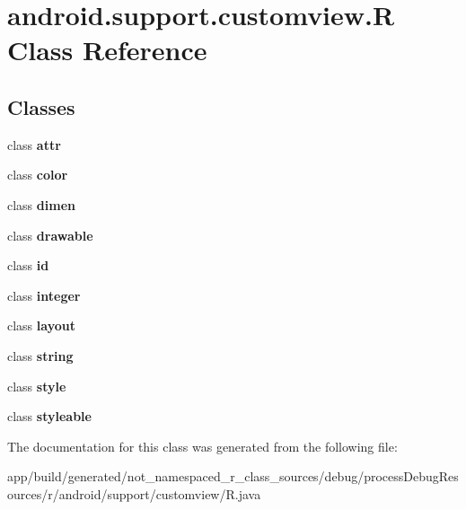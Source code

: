 \hypertarget{classandroid_1_1support_1_1customview_1_1_r}{}\section{android.\+support.\+customview.\+R Class Reference}
\label{classandroid_1_1support_1_1customview_1_1_r}
\subsection*{Classes}
\begin{DoxyCompactItemize}
\item 
class {\bfseries attr}
\item 
class {\bfseries color}
\item 
class {\bfseries dimen}
\item 
class {\bfseries drawable}
\item 
class {\bfseries id}
\item 
class {\bfseries integer}
\item 
class {\bfseries layout}
\item 
class {\bfseries string}
\item 
class {\bfseries style}
\item 
class {\bfseries styleable}
\end{DoxyCompactItemize}


The documentation for this class was generated from the following file\+:\begin{DoxyCompactItemize}
\item 
app/build/generated/not\+\_\+namespaced\+\_\+r\+\_\+class\+\_\+sources/debug/process\+Debug\+Resources/r/android/support/customview/R.\+java\end{DoxyCompactItemize}
